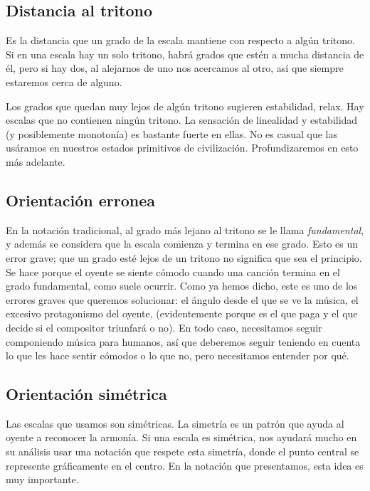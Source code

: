 \documentclass[]{article}
\begin{document}
\subsection{Distancia al tritono}

Es la distancia que un grado de la escala mantiene con respecto a algún tritono. Si en una escala hay un solo tritono, habrá grados que estén a mucha distancia de él, pero si hay dos, al alejarnos de uno nos acercamos al otro, así que siempre estaremos cerca de alguno.

Los grados que quedan muy lejos de algún tritono sugieren estabilidad, relax. Hay escalas que no contienen ningún tritono. La sensación de linealidad y estabilidad (y posiblemente monotonía) es bastante fuerte en ellas. No es casual que las usáramos en nuestros estados primitivos de civilización. Profundizaremos en esto más adelante.

\subsection{Orientación erronea}

En la notación tradicional, al grado más lejano al tritono se le llama \emph{fundamental}, y además se considera que la escala comienza y termina en ese grado. Esto es un error grave; que un grado esté lejos de un tritono no significa que sea el principio. Se hace porque el oyente se siente cómodo cuando una canción termina en el grado fundamental, como suele ocurrir. Como ya hemos dicho, este es uno de los errores graves que queremos solucionar: el ángulo desde el que se ve la música, el excesivo protagonismo del oyente, (evidentemente porque es el que paga y el que decide si el compositor triunfará o no). En todo caso, necesitamos seguir componiendo música para humanos, así que deberemos seguir teniendo en cuenta lo que les hace sentir cómodos o lo que no, pero necesitamos entender por qué.

\subsection{Orientación simétrica}

Las escalas que usamos son simétricas. La simetría es un patrón que ayuda al oyente a reconocer la armonía. Si una escala es simétrica, nos ayudará mucho en su análisis usar una notación que respete esta simetría, donde el punto central se represente gráficamente en el centro. En la notación que presentamos, esta idea es muy importante.
\end{document}
